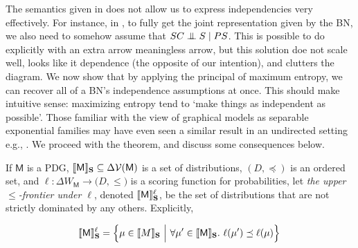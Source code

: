 \documentclass{article}
\newcommand{\V}{\mathcal V}
\newcommand{\sfM}{\mathsf M}
\newcommand{\MN}{PDG}
\numberwithin{equation}{section}
\begin{document}
	The semantics given in  does not allow us to express independencies very effectively.
	For instance, in , to fully get the joint representation given by the BN, we also need to somehow assume that $SC \mathrel{\perp\mspace{-10mu}\perp} S \mid PS$. This is possible to do explicitly with an extra arrow meaningless arrow, but this solution doe not scale well, looks like it dependence (the opposite of our intention), and clutters the diagram. 
	We now show that by applying the principal of maximum entropy, we can recover all of a BN's independence assumptions at once. This should make intuitive sense: maximizing entropy tend to `make things as independent as possible'. 
	Those familiar with the view of graphical models as separable exponential families may have even seen a similar result in an undirected setting e.g., \parencite[cf.][pp. 37-39]{wainwright2008graphical}. 
	We proceed with the theorem, and discuss some consequences below.

\begin{vfull}
		
		
		
		
		\begin{defn}
			If  $\sfM$ is a \MN, $\bbr{\sfM}_{\mathbf S} \subseteq \Delta \V(\sfM)$ is a set of distributions, $(D, \preceq)$ is an ordered set, and $\ell : \Delta W_{\sfM} \to \mathbb (D, \leq)$ is a scoring function for probabilities, let \emph{the upper $\leq$-frontier under $\ell$}, denoted $\bbr{\sfM}_{\mathbf S}^\ell$, be the set of distributions that are not strictly dominated by any others. Explicitly,
			
			\begin{equation*}
				\bbr{\sfM}_{\mathbf S}^\ell =  \left\{\mu \in \llbracket M \rrbracket_{\mathbf S} ~\Big|~ \forall \mu' \in \bbr{\sfM}_{\mathbf S}.~ \ell(\mu') \preceq \ell(\mu)  \right\} \\
			\end{equation*}
		\end{defn}
\end{vfull}
\end{document}
